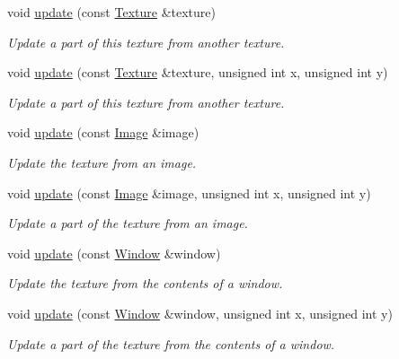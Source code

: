 \begin{DoxyCompactItemize}
void \mbox{\hyperlink{classsf_1_1_texture_af9885ca00b74950d60feea28132d9691}{update}} (const \mbox{\hyperlink{classsf_1_1_texture}{Texture}} \&texture)
\begin{DoxyCompactList}\small\item\em Update a part of this texture from another texture. \end{DoxyCompactList}\item 
void \mbox{\hyperlink{classsf_1_1_texture_a89beb474da1da84b5e38c9fc0b441fe4}{update}} (const \mbox{\hyperlink{classsf_1_1_texture}{Texture}} \&texture, unsigned int x, unsigned int y)
\begin{DoxyCompactList}\small\item\em Update a part of this texture from another texture. \end{DoxyCompactList}\item 
void \mbox{\hyperlink{classsf_1_1_texture_a037cdf171af0fb392d07626a44a4ea17}{update}} (const \mbox{\hyperlink{classsf_1_1_image}{Image}} \&image)
\begin{DoxyCompactList}\small\item\em Update the texture from an image. \end{DoxyCompactList}\item 
void \mbox{\hyperlink{classsf_1_1_texture_a87f916490b757fe900798eedf3abf3ba}{update}} (const \mbox{\hyperlink{classsf_1_1_image}{Image}} \&image, unsigned int x, unsigned int y)
\begin{DoxyCompactList}\small\item\em Update a part of the texture from an image. \end{DoxyCompactList}\item 
void \mbox{\hyperlink{classsf_1_1_texture_ad3cceef238f7d5d2108a98dd38c17fc5}{update}} (const \mbox{\hyperlink{classsf_1_1_window}{Window}} \&window)
\begin{DoxyCompactList}\small\item\em Update the texture from the contents of a window. \end{DoxyCompactList}\item 
void \mbox{\hyperlink{classsf_1_1_texture_a154f246eb8059b602076009ab1cfd175}{update}} (const \mbox{\hyperlink{classsf_1_1_window}{Window}} \&window, unsigned int x, unsigned int y)
\begin{DoxyCompactList}\small\item\em Update a part of the texture from the contents of a window. \end{DoxyCompactList}\item 

\end{DoxyCompactItemize}
